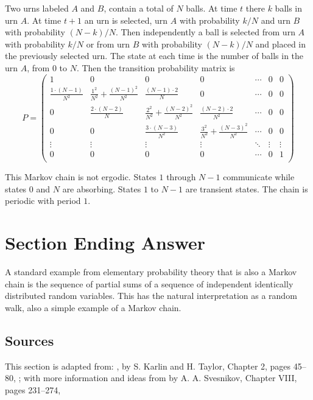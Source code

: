 \documentclass[12pt]{article}
\begin{document}
Two urns labeled \( A \) and \( B \), contain a total of \( N \) balls.
At time \( t \) there \( k \) balls in urn \( A \).  At time \( t + 1 \)
an urn is selected, urn \( A \) with probability \( k/N \) and urn \( B \)
with probability \( (N-k)/N \).  Then independently a ball is selected
from urn \( A \) with probability \( k/N \) or from urn \( B \) with
probability \( (N-k)/N \) and placed in the previously selected urn.
The state at each time is the number of balls in the urn \( A \), from \(
0 \) to \( N \).  Then the transition probability matrix is
\[
    P =
    \begin{pmatrix}
        1 & 0 & 0 & 0 & \cdots & 0 & 0 \\
        \frac{1 \cdot(N-1)}{N^2} & \frac{1^2}{N^2} +\frac{(N-1)^2}{N^2}
        & \frac{(N-1) \cdot 2 }{N} & 0 & \cdots & 0 & 0 \\
        0 & \frac{2 \cdot (N-2)}{N} & \frac{2^2}{N^{2}} + \frac{(N-2)^2}
        {N^2} & \frac{(N-2) \cdot 2}{N^{2}} & \cdots & 0 & 0 \\
        0 & 0 & \frac{3 \cdot (N-3)}{N^2} & \frac{3^2}{N^{2}} + \frac{(N-3)^2}
        {N^2} & \cdots & 0 & 0 \\
        \vdots & \vdots & \vdots & \vdots & \ddots & \vdots & \vdots \\
        0 & 0 & 0 & 0 & \cdots & 0 & 1 \\
    \end{pmatrix}
\]

This Markov chain is not ergodic.  States \( 1 \) through \( N-1 \)
communicate while states \( 0 \) and \( N \) are absorbing.  States \( 1
\) to \( N-1 \) are transient states.  The chain is periodic with period
\( 1 \).

\section*{Section Ending Answer}

A standard example from elementary probability theory that is also a
Markov chain is the sequence of partial sums of a sequence of
independent identically distributed random variables.  This has the
natural interpretation as a random walk, also a simple example of a
Markov chain.

\subsection*{Sources} This section is adapted from:  , by S. Karlin and H. Taylor, Chapter 2,
pages 45--80,
\cite{karlin75}; with more information and
ideas from  by A. A. Svesnikov, Chapter
VIII, pages 231--274,
\cite{svesnikov68}
\end{document}
